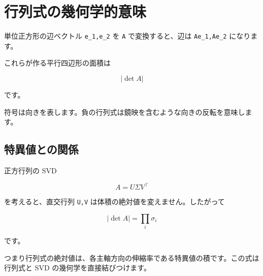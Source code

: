 \documentclass[
  11pt,
  a4paper,
]{ltjsarticle}
\author{}
\date{}
\begin{document}
\hypertarget{ux884cux5217ux5f0fux306eux5e7eux4f55ux5b66ux7684ux610fux5473}{%
\section{行列式の幾何学的意味}\label{ux884cux5217ux5f0fux306eux5e7eux4f55ux5b66ux7684ux610fux5473}}

単位正方形の辺ベクトル \texttt{e\_1,e\_2} を \texttt{A}
で変換すると、辺は \texttt{Ae\_1,Ae\_2} になります。

これらが作る平行四辺形の面積は

\[
|\det A|
\]

です。

符号は向きを表します。負の行列式は鏡映を含むような向きの反転を意味します。

\hypertarget{ux7279ux7570ux5024ux3068ux306eux95a2ux4fc2}{%
\subsection{特異値との関係}\label{ux7279ux7570ux5024ux3068ux306eux95a2ux4fc2}}

正方行列の SVD

\[
A=U\Sigma V^\top
\]

を考えると、直交行列 \texttt{U,V} は体積の絶対値を変えません。したがって

\[
|\det A|=\prod_i\sigma_i
\]

です。

つまり行列式の絶対値は、各主軸方向の伸縮率である特異値の積です。この式は行列式と
SVD の幾何学を直接結びつけます。
\end{document}
